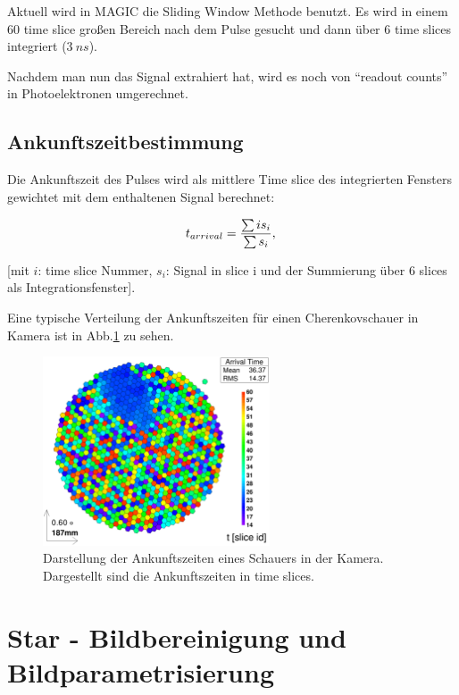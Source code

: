 Aktuell wird in MAGIC die Sliding Window Methode benutzt. Es wird in einem 60 time slice großen Bereich nach dem Pulse gesucht und dann über 6 time slices integriert ($\SI{3}{ns}$).

Nachdem man nun das Signal extrahiert hat, wird es noch von ``readout counts'' in Photoelektronen umgerechnet.

\subsection{Ankunftszeitbestimmung}
Die Ankunftszeit des Pulses wird als mittlere Time slice des integrierten Fensters gewichtet mit dem enthaltenen Signal berechnet:

\begin{equation}
 t_{arrival}=\frac{\sum i s_i}{\sum s_i},\\
\end{equation}
\begin{center}
\small{[mit $i$: time slice Nummer, $s_i$: Signal in slice i und der Summierung über 6 slices als Integrationsfenster].}
\end{center}


Eine typische Verteilung der Ankunftszeiten für einen Cherenkovschauer in Kamera ist in Abb.\ref{Kamera-Bild-ArrivalTimes} zu sehen.

\begin{figure}
    \centering
    \includegraphics[width=0.6\textwidth]{./Plots/03_MonteCarlos/Signal_ArrivalTime_fertig.png}
    \caption{Darstellung der Ankunftszeiten eines Schauers in der Kamera. Dargestellt sind die Ankunftszeiten in time slices.}
    \label{Kamera-Bild-ArrivalTimes}
\end{figure}

\section{Star - Bildbereinigung und Bildparametrisierung}
\label{sec:Star-ImageCleaning}

